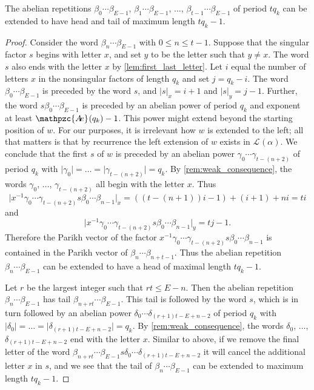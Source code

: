 \documentclass[a4paper,fleqn]{article}
\providecommand{\abs}[1]{\lvert#1\rvert}
\newcommand{\Lang}[2][]{\mathcal{L}_{#1}(#2)}
\newcommand{\abexp}[2][]{\mathpzc{A\mkern-3mu e}_{#1}(#2)}
\begin{document}
  \begin{claim}\label{cl:extension}
    The abelian repetitions $\beta_0 \dotsm \beta_{E-1}$, $\beta_1 \dotsm \beta_{E-1}$, $\ldots$,
    $\beta_{t-1} \dotsm \beta_{E-1}$ of period $tq_k$ can be extended to have head and tail of maximum length
    $tq_k - 1$.
  \end{claim}
  \begin{proof}
    Consider the word $\beta_n \dotsm \beta_{E-1}$ with $0 \leq n \leq t - 1$. Suppose that the singular factor $s$
    begins with letter $x$, and set $y$ to be the letter such that $y \neq x$. The word $s$ also ends with
    the letter $x$ by \autoref{lem:first_last_letter}. Let $i$ equal the number of letters $x$ in the nonsingular
    factors of length $q_k$ and set $j = q_k - i$. The word $\beta_0 \dotsm \beta_{E-1}$ is preceded by the word $s$,
    and $\abs{s}_x = i + 1$ and $\abs{s}_y = j - 1$. Further, the word $s \beta_0 \dotsm \beta_{E-1}$ is preceded by an
    abelian power of period $q_k$ and exponent at least $\abexp{q_k} - 1$. This power might extend beyond the starting
    position of $w$. For our purposes, it is irrelevant how $w$ is extended to the left; all that matters is that by
    recurrence the left extension of $w$ exists in $\Lang{\alpha}$. We conclude that the first $s$ of $w$ is preceded
    by an abelian power $\gamma_0 \dotsm \gamma_{t - (n + 2)}$ of period $q_k$ with
    $\abs{\gamma_0} = \ldots = \abs{\gamma_{t - (n + 2)}} = q_k$. By \autoref{rem:weak_consequence}, the words
    $\gamma_0$, $\ldots$, $\gamma_{t - (n + 2)}$ all begin with the letter $x$. Thus
    \begin{equation*}
      \abs{x^{-1}\gamma_0 \dotsm \gamma_{t - (n + 2)} s \beta_0 \dotsm \beta_{n-1}}_x = ((t - (n + 1))i - 1) + (i + 1) + ni = ti
    \end{equation*}
    and
    \begin{equation*}
      \abs{x^{-1}\gamma_0 \dotsm \gamma_{t - (n + 2)} s \beta_0 \dotsm \beta_{n-1}}_y = tj - 1.
    \end{equation*}
    Therefore the Parikh vector of the factor $x^{-1}\gamma_0 \dotsm \gamma_{t - (n + 2)} s \beta_0 \dotsm \beta_{n-1}$
    is contained in the Parikh vector of $\beta_n \dotsm \beta_{n + t - 1}$. Thus the abelian repetition 
    $\beta_n \dotsm \beta_{E-1}$ can be extended to have a head of maximal length $tq_k - 1$.

    Let $r$ be the largest integer such that $rt \leq E - n$. Then the abelian repetition $\beta_n \dotsm \beta_{E-1}$
    has tail $\beta_{n + rt} \dotsm \beta_{E-1}$. This tail is followed by the word $s$, which is in turn followed by
    an abelian power $\delta_0 \dotsm \delta_{(r+1)t - E + n - 2}$ of period $q_k$ with
    $\abs{\delta_0} = \ldots = \abs{\delta_{(r+1)t - E + n - 2}} = q_k$. By \autoref{rem:weak_consequence}, the words
    $\delta_0$, $\ldots$, $\delta_{(r+1)t - E + n - 2}$ end with the letter $x$. Similar to above, if we remove the
    final letter of the word $\beta_{n + rt} \dotsm \beta_{E-1} s \delta_0 \dotsm \delta_{(r+1)t - E + n - 2}$ it will
    cancel the additional letter $x$ in $s$, and we see that the tail of $\beta_n \dotsm \beta_{E-1}$ can be extended
    to maximum length $tq_k - 1$.
  \end{proof}
\end{document}
